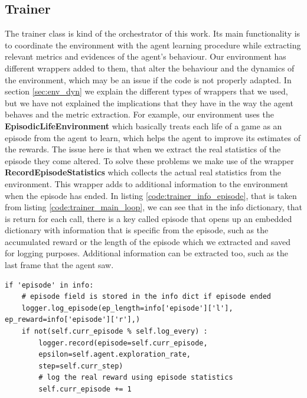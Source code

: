 \subsection{Trainer}
The trainer class is kind of the orchestrator of this work. Its main functionality is to coordinate the environment with the agent learning procedure while extracting relevant metrics and evidences of the agent's behaviour. Our environment has different wrappers added to them, that alter the behaviour and the dynamics of the environment, which may be an issue if the code is not properly adapted. In section \ref{sec:env_dyn} we explain the different types of wrappers that we used, but we have not explained the implications that they have in the way the agent behaves and the metric extraction. For example, our environment uses the \textbf{EpisodicLifeEnvironment} which basically treats each life of a game as an episode from the agent to learn, which helps the agent to improve its estimates of the rewards. The issue here is that when we extract the real statistics of the episode they come altered. To solve these problems we make use of the wrapper \textbf{RecordEpisodeStatistics} which collects the actual real statistics from the environment. This wrapper adds to additional information to the environment when the episode has ended. In listing \ref{code:trainer_info_episode}, that is taken from listing \ref{code:trainer_main_loop}, we can see that in the info dictionary, that is return for each  call, there is a key called episode that opens up an embedded dictionary with information that is specific from the episode, such as the accumulated reward or the length of the episode which we extracted and saved for logging purposes. Additional information can be extracted too, such as the last frame that the agent saw.

\begin{lstlisting}[caption={Episodic information retrival from \textbf{RecordEpisodeStatistics} wrapper}, label={code:trainer_info_episode}]
if 'episode' in info:
	# episode field is stored in the info dict if episode ended
	logger.log_episode(ep_length=info['episode']['l'], ep_reward=info['episode']['r'],)
	if not(self.curr_episode % self.log_every) :
		logger.record(episode=self.curr_episode, 
		epsilon=self.agent.exploration_rate, 
		step=self.curr_step)
		# log the real reward using episode statistics
		self.curr_episode += 1
\end{lstlisting}

